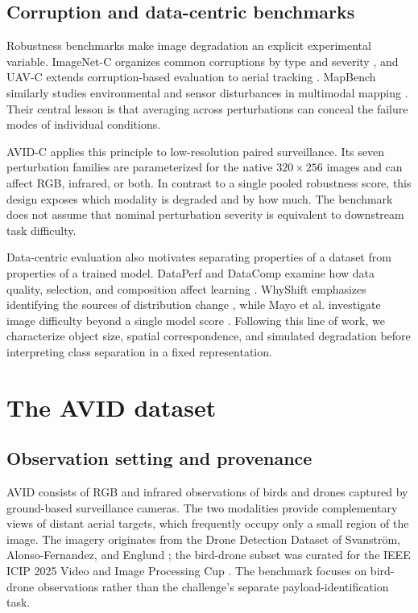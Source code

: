 \documentclass[10pt]{article}
\newcommand{\dataset}{\textsc{AVID}}
\newcommand{\corrupt}{\textsc{AVID-C}}
\begin{document}
\subsection{Corruption and data-centric benchmarks}

Robustness benchmarks make image degradation an explicit experimental variable. ImageNet-C organizes common corruptions by type and severity \citep{hendrycks2019benchmarking}, and UAV-C extends corruption-based evaluation to aerial tracking \citep{liu2024uavc}. MapBench similarly studies environmental and sensor disturbances in multimodal mapping \citep{hao2024mapbench}. Their central lesson is that averaging across perturbations can conceal the failure modes of individual conditions.

\corrupt{} applies this principle to low-resolution paired surveillance. Its seven perturbation families are parameterized for the native $320\times256$ images and can affect RGB, infrared, or both. In contrast to a single pooled robustness score, this design exposes which modality is degraded and by how much. The benchmark does not assume that nominal perturbation severity is equivalent to downstream task difficulty.

Data-centric evaluation also motivates separating properties of a dataset from properties of a trained model. DataPerf and DataComp examine how data quality, selection, and composition affect learning \citep{mazumder2023dataperf,gadre2023datacomp}. WhyShift emphasizes identifying the sources of distribution change \citep{liu2023whyshift}, while Mayo et al. investigate image difficulty beyond a single model score \citep{mayo2023difficulty}. Following this line of work, we characterize object size, spatial correspondence, and simulated degradation before interpreting class separation in a fixed representation.

\section{The AVID dataset}
\label{sec:dataset}

\subsection{Observation setting and provenance}

\dataset{} consists of RGB and infrared observations of birds and drones captured by ground-based surveillance cameras. The two modalities provide complementary views of distant aerial targets, which frequently occupy only a small region of the image. The imagery originates from the Drone Detection Dataset of Svanstr\"om, Alonso-Fernandez, and Englund \citep{svanstrom2021multisensor,svanstrom2020repository}; the bird-drone subset was curated for the IEEE ICIP 2025 Video and Image Processing Cup \citep{ieeevipcup2025}. The benchmark focuses on bird-drone observations rather than the challenge's separate payload-identification task.
\end{document}
